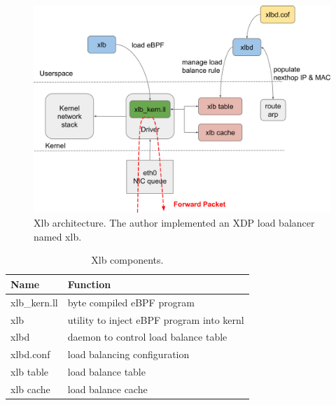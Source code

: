 \begin{figure}[h]
  \centering
  \includegraphics[width=0.9\columnwidth]{Figs/xlb-schem}

  \par\bigskip
  \centering
  \begin{minipage}{0.9\columnwidth}
    \caption[Xlb architecture]{
      Xlb architecture.
      The author implemented an XDP load balancer named xlb.
    }
    \label{fig:xlb-schem}
  \end{minipage}
\end{figure}

\begin{table}[h]
  \centering
  \begin{tabular}{|l|l|}
    \hline
    Name & Function \\ \hline
    xlb\_kern.ll & byte compiled eBPF program  \\ \hline
    xlb & utility to inject eBPF program into kernl  \\ \hline
    xlbd & daemon to control load balance table  \\ \hline
    xlbd.conf & load balancing configuration  \\ \hline
    xlb table & load balance table  \\ \hline
    xlb cache & load balance cache  \\ \hline
  \end{tabular}

  \par\bigskip
  \centering
  \begin{minipage}{0.9\columnwidth}
    \caption[Xlb components]{
      Xlb components.
    }
    \label{table:xlb-progs}
  \end{minipage}
\end{table}

